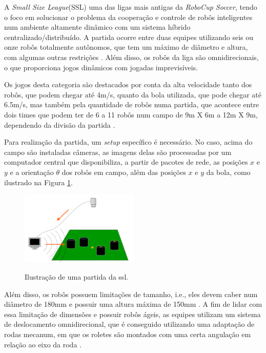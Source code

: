 \documentclass[acronym, symbols]{fei}
\begin{document}
		A \textit{Small Size League}(SSL) uma das ligas mais antigas da \textit{RoboCup Soccer}, tendo o foco em solucionar o problema da cooperação e controle de robôs inteligentes num ambiente altamente dinâmico com um sistema híbrido centralizado/distribuído. A partida ocorre entre duas equipes utilizando seis ou onze robôs totalmente autônomos, que tem um máximo de diâmetro e altura, com algumas outras restrições \cite{RoboCup}. Além disso, os robôs da liga são omnidirecionais, o que proporciona jogos dinâmicos com jogadas imprevisíveis.
		
		Os jogos desta categoria são destacados por conta da alta velocidade tanto dos robôs, que podem chegar até 4m/s, quanto da bola utilizada, que pode chegar até 6.5m/s, mas também pela quantidade de robôs numa partida, que acontece entre dois times que podem ter de 6 a 11 robôs num campo de 9m X 6m a 12m X 9m, dependendo da divisão da partida \cite{10332958}.
		
		Para realização da partida, um \textit{setup} específico é necessário. No caso, acima do campo são instaladas câmeras, as imagens delas são processadas por um computador central que disponibiliza, a partir de pacotes de rede, as posições $x$ e $y$ e a orientação $\theta$ dos robôs em campo, além das posições $x$ e $y$ da bola, como ilustrado na Figura \ref{fig:ilustracao_partida_ssl}.
		
		\begin{figure}[!htb]
			\centering
			\caption{Ilustração de uma partida da \acrshort{ssl}.} 
			\includegraphics[width=0.5\textwidth]{funcionamento_ssl.png}
			\label{fig:ilustracao_partida_ssl}
		\end{figure}
		
		Além disso, os robôs possuem limitações de tamanho, i.e., eles devem caber num diâmetro de 180mm e possuir uma altura máxima de 150mm \cite{rules}. A fim de lidar com essa limitação de dimensões e possuir robôs ágeis, as equipes utilizam um sistema de deslocamento omnidirecional, que é conseguido utilizando uma adaptação de rodas mecanum, em que os roletes são montados com uma certa angulação em relação ao eixo da roda \cite{aguiarreformulaccao}.
		
\end{document}
